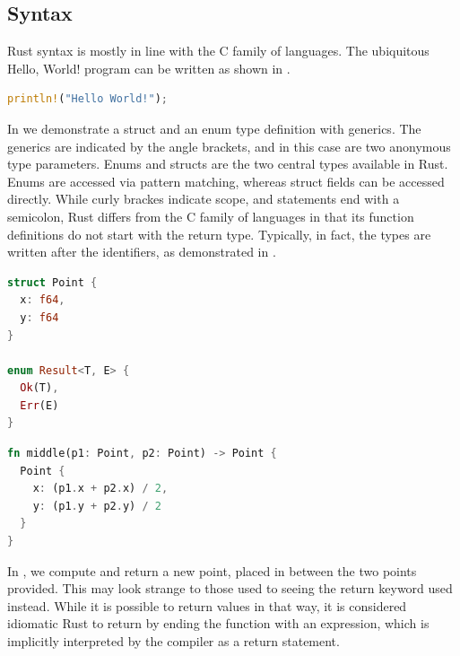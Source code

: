 \documentclass[paper=a4,%
  twoside,%
  BCOR4mm,%
  abstract=true,%
  toc=bibliography,%
  chapterprefix=true,%
  toc=bibliographynumbered,%
  open=right,%
  english,%
  pagesize=pdftex]{scrreprt}
\begin{document}
\subsection{Syntax}
Rust syntax is mostly in line with the C family of languages. The ubiquitous Hello, World! program can be written as shown in .
\begin{lstlisting}[language=Rust, style=boxed, caption=Hello World, label=lst:example-hello-world]
println!("Hello World!");
\end{lstlisting}

In  we demonstrate a struct and an enum type definition with generics. The generics are indicated by the angle brackets, and in this case are two anonymous type parameters. Enums and structs are the two central types available in Rust. Enums are accessed via pattern matching, whereas struct fields can be accessed directly. While curly brackes indicate scope, and statements end with a semicolon, Rust differs from the C family of languages in that its function definitions do not start with the return type. Typically, in fact, the types are written after the identifiers, as demonstrated in .

\begin{lstlisting}[language=Rust, style=boxed, caption={The type definition for a point in two-dimensional space and an enum definition}, label=lst:example-struct-enum]
struct Point {
  x: f64,
  y: f64
}

enum Result<T, E> {
  Ok(T),
  Err(E)
}
\end{lstlisting}


\begin{lstlisting}[language=Rust, style=boxed, caption={A function to compute the point between two points in two-dimensional space}, label=lst:example-functions-struct-enum]
fn middle(p1: Point, p2: Point) -> Point {
  Point {
    x: (p1.x + p2.x) / 2,
    y: (p1.y + p2.y) / 2
  }
}
\end{lstlisting}

In , we compute and return a new point, placed in between the two points provided. This may look strange to those used to seeing the return keyword used instead. While it is possible to return values in that way, it is considered idiomatic Rust to return by ending the function with an expression, which is implicitly interpreted by the compiler as a return statement.
\end{document}
